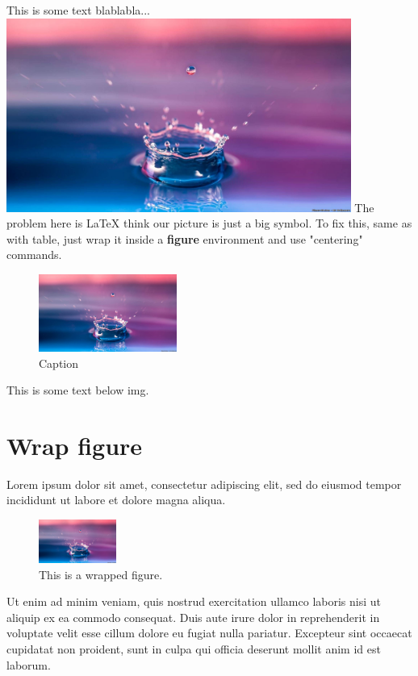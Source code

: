 \documentclass{article}
\begin{document}
This is some text blablabla...
\includegraphics[height=2.5in]{img1.jpg}
\newline
The problem here is LaTeX think our picture is just a big symbol. To fix this, same as with table, just wrap it inside a \textbf{figure} environment and use "centering" commands.
\begin{figure}[h!]
    \raggedleft %
    \includegraphics[height=1in]{img1.jpg}
    \caption{Caption}
\end{figure} \newline
This is some text below img.

\section{Wrap figure}
Lorem ipsum dolor sit amet, consectetur adipiscing elit, sed do eiusmod tempor incididunt ut labore et dolore magna aliqua.

\begin{figure}
    \includegraphics[width=1in]{img1.jpg}
    \caption{This is a wrapped figure.}
\end{figure}
Ut enim ad minim veniam, quis nostrud exercitation ullamco laboris nisi ut aliquip ex ea commodo consequat. Duis aute irure dolor in reprehenderit in voluptate velit esse cillum dolore eu fugiat nulla pariatur. Excepteur sint occaecat cupidatat non proident, sunt in culpa qui officia deserunt mollit anim id est laborum.
\end{document}
